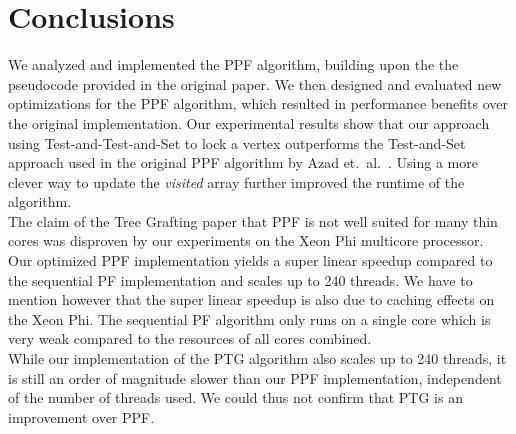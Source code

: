 \documentclass[letterpaper]{article}
\begin{document}
\section{Conclusions}

We analyzed and implemented the PPF algorithm, building upon the the pseudocode provided in the original paper. We then designed and evaluated new optimizations for the PPF algorithm, which resulted in performance benefits over the original implementation. Our experimental results show that our approach using Test-and-Test-and-Set to lock a vertex outperforms the  Test-and-Set approach used in the original PPF algorithm by Azad et.\ al.\ \cite{Azad:2012}. Using a more clever way to update the \textit{visited} array further improved the runtime of the algorithm.\\

The claim of the Tree Grafting paper \cite{Azad:2015} that PPF is not well suited for many thin cores was disproven by our experiments on the Xeon Phi multicore processor. Our optimized PPF implementation yields a super linear speedup compared to the sequential PF implementation and scales up to 240 threads. We have to mention however that the super linear speedup is also due to caching effects on the Xeon Phi. The sequential PF algorithm only runs on a single core which is very weak compared to the resources of all cores combined.\\

While our implementation of the PTG algorithm also scales up to 240 threads, it is still an order of magnitude slower than our PPF implementation, independent of the number of threads used. We could thus not confirm that PTG is an improvement over PPF.
\end{document}
